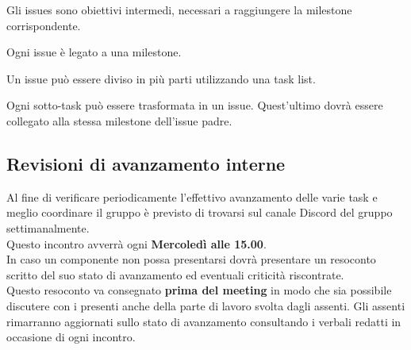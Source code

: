 \documentclass[a4paper, 12pt]{article}
\begin{document}
Gli issues sono obiettivi intermedi, necessari a raggiungere la milestone corrispondente.

Ogni issue è legato a una milestone.

Un issue può essere diviso in più parti utilizzando una task list.

Ogni sotto-task può essere trasformata in un issue. Quest'ultimo dovrà essere collegato alla stessa milestone dell'issue padre.

\subsection{Revisioni di avanzamento interne}\label{revisioni-di-avanzamento-interne}
Al fine di verificare periodicamente l'effettivo avanzamento delle varie task e meglio coordinare il gruppo è previsto di trovarsi sul canale Discord del gruppo settimanalmente.\\

Questo incontro avverrà ogni \textbf{Mercoledì alle 15.00}.\\

In caso un componente non possa presentarsi dovrà presentare un resoconto scritto del suo stato di avanzamento ed eventuali criticità riscontrate.\\

Questo resoconto va consegnato \textbf{prima del meeting} in modo che sia possibile discutere con i presenti anche della parte di lavoro svolta dagli assenti.
Gli assenti rimarranno aggiornati sullo stato di avanzamento consultando i verbali redatti in occasione di ogni incontro.
\end{document}

